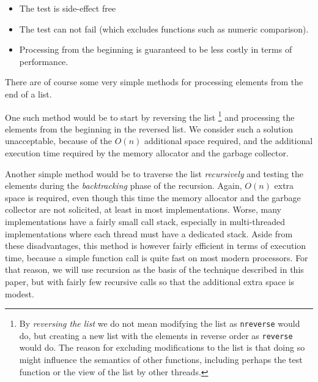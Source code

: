 \begin{itemize}
\item The test is side-effect free
\item The test can not fail (which excludes functions such as numeric
  comparison).
\item Processing from the beginning is guaranteed to be less costly in
  terms of performance.
\end{itemize}

There are of course some very simple methods for processing elements
from the end of a list.

One such method would be to start by reversing the list%
\footnote{By \emph{reversing the list} we do not mean modifying the
  list as \texttt{nreverse} would do, but creating a new list with the
  elements in reverse order as \texttt{reverse} would do.  The reason
  for excluding modifications to the list is that doing so might
  influence the semantics of other functions, including perhaps the
  test function or the view of the list by other threads.}
and processing the elements from the beginning in the reversed list.
We consider such a solution unacceptable, because of the $O(n)$
additional space required, and the additional execution time required
by the memory allocator and the garbage collector.

Another simple method would be to traverse the list \emph{recursively}
and testing the elements during the \emph{backtracking} phase of the
recursion.  Again, $O(n)$ extra space is required, even though this
time the memory allocator and the garbage collector are not solicited,
at least in most implementations.  Worse, many implementations have a
fairly small call stack, especially in multi-threaded implementations
where each thread must have a dedicated stack.  Aside from these
disadvantages, this method is however fairly efficient in terms of
execution time, because a simple function call is quite fast on most
modern processors.  For that reason, we will use recursion as the
basis of the technique described in this paper, but with fairly few
recursive calls so that the additional extra space is modest.

